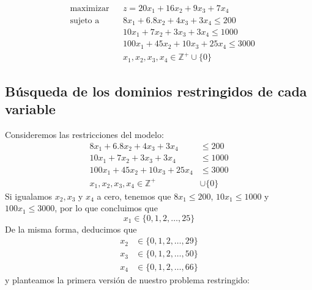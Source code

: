 \documentclass[11pt]{article}
\begin{document}
\begin{equation} \label{modelo}
    \begin{aligned}
        &\text{maximizar} && z = 20 x_1 + 16 x_2 + 9 x_3 + 7 x_4\\
        &\text{sujeto a} && 8 x_1 + 6.8 x_2 + 4 x_3 + 3 x_4 \leq 200\\
        &   &&10 x_1 + 7 x_2 + 3 x_3 + 3 x_4 \leq 1000\\
        &   && 100 x_1 + 45 x_2 + 10 x_3 + 25 x_4 \leq 3000\\
        &   && x_1, x_2, x_3, x_4 \in \mathbb{Z}^+ \cup \{0\}
    \end{aligned}
\end{equation}

    \hypertarget{buxfasqueda-de-los-dominios-restringidos-de-cada-variable}{%
\subsection{Búsqueda de los dominios restringidos de cada
variable}\label{buxfasqueda-de-los-dominios-restringidos-de-cada-variable}}

    Consideremos las restricciones del modelo:
\begin{align}
    8 x_1 + 6.8 x_2 + 4 x_3 + 3 x_4 &\leq 200\\
    10 x_1 + 7 x_2 + 3 x_3 + 3 x_4 &\leq 1000\\
    100 x_1 + 45 x_2 + 10 x_3 + 25 x_4 &\leq 3000\\
    x_1, x_2, x_3, x_4 \in \mathbb{Z}^+ &\cup \{0\}
\end{align}
Si igualamos \(x_2, x_3\) y \(x_4\) a cero, tenemos que
\(8 x_1 \leq 200\), \(10x_1 \leq 1000\) y \(100 x_1 \leq 3000\), por lo
que concluimos que
\begin{equation}
    x_1 \in \{0, 1, 2, \dots, 25\}
\end{equation}
De la misma forma, deducimos que
\begin{align}
    x_2 &\in \{0, 1, 2, \dots, 29\}\\
    x_3 &\in \{0, 1, 2, \dots, 50\}\\
    x_4 &\in \{0, 1, 2, \dots, 66\}
\end{align}
y planteamos la primera versión de nuestro problema restringido:
\end{document}
